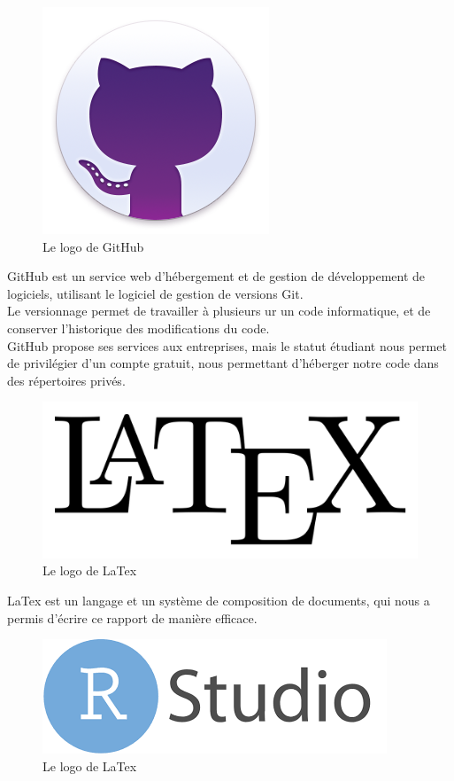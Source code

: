 \begin{figure}[!h]
	\center
	\includegraphics[scale=0.2]{img/desktop-logo.png}
	\caption {Le logo de GitHub}
\end{figure}
GitHub est un service web d'hébergement et de gestion de développement de logiciels, utilisant le logiciel de gestion de versions Git. \\
Le versionnage permet de travailler à plusieurs ur un code informatique, et de conserver l'historique des modifications du code. \\
GitHub propose ses services aux entreprises, mais le statut étudiant nous permet de privilégier d'un compte gratuit, nous permettant d'héberger notre code dans des répertoires privés.\\

\begin{figure}[!h]
	\center
	\includegraphics[scale=0.1]{img/latex.png}
	\caption {Le logo de LaTex}
\end{figure}

LaTex est un langage et un système de composition de documents, qui nous a permis d'écrire ce rapport de manière efficace.

\begin{figure}[!h]
	\center
	\includegraphics[scale=0.2]{img/rstudio.png}
	\caption {Le logo de LaTex}
\end{figure}

